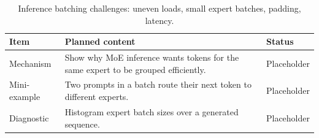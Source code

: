 \begin{table}[H]
\centering
\caption{Inference batching challenges: uneven loads, small expert batches, padding, latency.}
\label{tab:ch12-batching-routed-tokens-at-inference}
\begin{tabularx}{\textwidth}{p{}X p{}}
\toprule
Item & Planned content & Status \\
\midrule
Mechanism & Show why MoE inference wants tokens for the same expert to be grouped efficiently. & Placeholder \\
Mini-example & Two prompts in a batch route their next token to different experts. & Placeholder \\
Diagnostic & Histogram expert batch sizes over a generated sequence. & Placeholder \\
\bottomrule
\end{tabularx}
\end{table}
